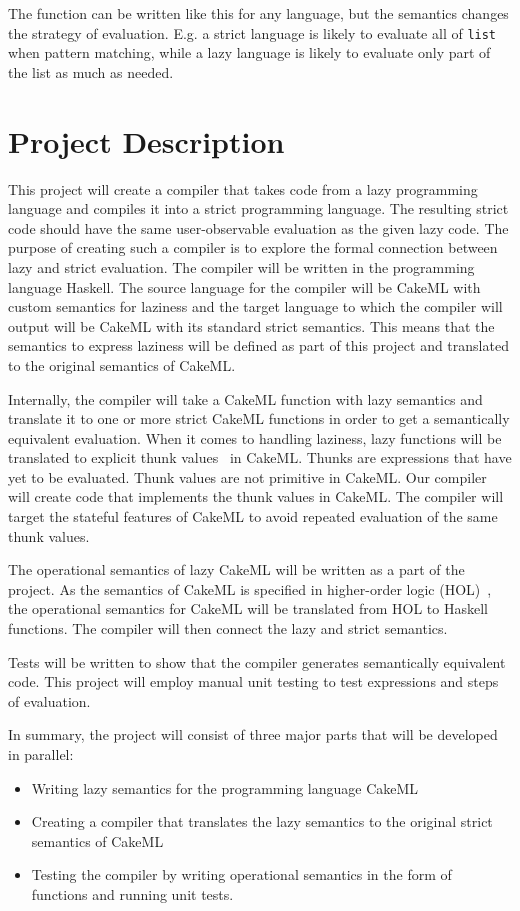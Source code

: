 \noindent The function can be written like this for any language, but the semantics
changes the strategy of evaluation. E.g. a strict language is likely to evaluate
all of \texttt{list} when pattern matching, while a lazy language is likely to
evaluate only part of the list as much as needed. 


\section{Project Description}

This project will create a compiler that takes code from a lazy programming
language and compiles it into a strict programming language. The resulting
strict code should have the same user-observable evaluation as the given lazy
code. The purpose of creating such a compiler is to explore the formal
connection between lazy and strict evaluation. The compiler will be written in
the programming language Haskell. The source language for the compiler will be
CakeML with custom semantics for laziness and the target language to which
the compiler will output will be CakeML with its standard strict semantics. This
means that the semantics to express laziness will be defined as part of this
project and translated to the original semantics of CakeML.

Internally, the compiler will take a
CakeML function with lazy semantics and translate it to one
or more strict CakeML functions in order to get a semantically equivalent
evaluation. When it comes to handling laziness, lazy functions will be
translated to explicit thunk values~\cite{Ingerman:1961:TWC:366062.366084} in
CakeML. Thunks are expressions that have yet to be evaluated. Thunk values are
not primitive in CakeML. Our compiler will create code that
implements the thunk values in CakeML. The compiler will target the stateful
features of CakeML to avoid repeated evaluation of the same thunk values.

The operational semantics of lazy CakeML will be written as a part of the
project. As the semantics of CakeML is specified in higher-order logic
(HOL)~\cite{HOLInter57:online},
the operational semantics for CakeML will be translated from HOL to Haskell
functions. The compiler will then connect the lazy and strict semantics.

Tests will be written to show that the compiler generates semantically
equivalent code. This project will employ manual unit testing to test
expressions and steps of evaluation.

In summary, the project will consist of three major parts that will be developed
in parallel:
\begin{itemize}
 \item Writing lazy semantics for the programming language CakeML
 \item Creating a compiler that translates the lazy semantics to the original strict semantics of CakeML
 \item Testing the compiler by writing operational semantics in the form of functions and running unit tests.
\end{itemize}
